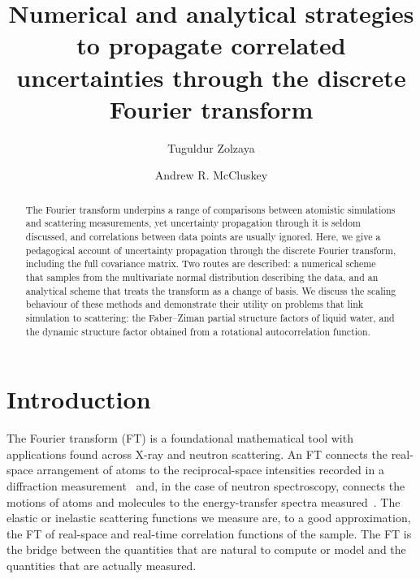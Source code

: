 \documentclass[reprint,
               superscriptaddress,
               nobibnotes,
               amsmath,
               amssymb,
               aps,
               hidelinks, 
               pre]{revtex4-2}
\newcommand{\papertitle}{Numerical and analytical strategies to propagate correlated uncertainties through the discrete Fourier transform}
\begin{document}
\title{\papertitle}

\author{Tuguldur Zolzaya}
\author{Andrew R. McCluskey}

\begin{abstract}
    The Fourier transform underpins a range of comparisons between atomistic simulations and scattering measurements, yet uncertainty propagation through it is seldom discussed, and correlations between data points are usually ignored. 
    Here, we give a pedagogical account of uncertainty propagation through the discrete Fourier transform, including the full covariance matrix. 
    Two routes are described: a numerical scheme that samples from the multivariate normal distribution describing the data, and an analytical scheme that treats the transform as a change of basis. 
    We discuss the scaling behaviour of these methods and demonstrate their utility on problems that link simulation to scattering: the Faber--Ziman partial structure factors of liquid water, and the dynamic structure factor obtained from a rotational autocorrelation function.
\end{abstract}

\maketitle 

\section{Introduction}
\label{sec:intro}

The Fourier transform (FT) is a foundational mathematical tool with applications found across X-ray and neutron scattering. 
An FT connects the real-space arrangement of atoms to the reciprocal-space intensities recorded in a diffraction measurement~\cite{Paalman1963, Youngs2019} and, in the case of neutron spectroscopy, connects the motions of atoms and molecules to the energy-transfer spectra measured~\cite{Bee1988}. 
The elastic or inelastic scattering functions we measure are, to a good approximation, the FT of real-space and real-time correlation functions of the sample. 
The FT is the bridge between the quantities that are natural to compute or model and the quantities that are actually measured.
\end{document}
